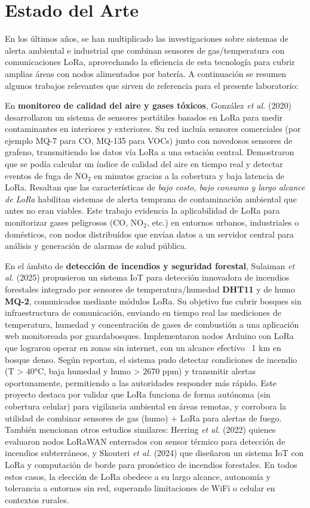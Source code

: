 \section{Estado del Arte}
En los últimos años, se han multiplicado las investigaciones sobre sistemas de alerta ambiental e industrial que combinan sensores de gas/temperatura con comunicaciones LoRa, aprovechando la eficiencia de esta tecnología para cubrir amplias áreas con nodos alimentados por batería. A continuación se resumen algunos trabajos relevantes que sirven de referencia para el presente laboratorio:

En \textbf{monitoreo de calidad del aire y gases tóxicos}, González \textit{et al.} (2020) \cite{Gonzalez2020} desarrollaron un sistema de sensores portátiles basados en LoRa para medir contaminantes en interiores y exteriores. Su red incluía sensores comerciales (por ejemplo MQ-7 para CO, MQ-135 para VOCs) junto con novedosos sensores de grafeno, transmitiendo los datos vía LoRa a una estación central. Demostraron que se podía calcular un índice de calidad del aire en tiempo real y detectar eventos de fuga de NO$_2$ en minutos gracias a la cobertura y baja latencia de LoRa. Resaltan que las características de \textit{bajo costo, bajo consumo y largo alcance de LoRa} habilitan sistemas de alerta temprana de contaminación ambiental que antes no eran viables. Este trabajo evidencia la aplicabilidad de LoRa para monitorizar gases peligrosos (CO, NO$_2$, etc.) en entornos urbanos, industriales o domésticos, con nodos distribuídos que envían datos a un servidor central para análisis y generación de alarmas de salud pública.

En el ámbito de \textbf{detección de incendios y seguridad forestal}, Sulaiman \textit{et al.} (2025) \cite{Sulaiman2025} propusieron un sistema IoT para detección innovadora de incendios forestales integrado por sensores de temperatura/humedad \textbf{DHT11} y de humo \textbf{MQ-2}, comunicados mediante módulos LoRa. Su objetivo fue cubrir bosques sin infraestructura de comunicación, enviando en tiempo real las mediciones de temperatura, humedad y concentración de gases de combustión a una aplicación web monitoreada por guardabosques. Implementaron nodos Arduino con LoRa que lograron operar en zonas sin internet, con un alcance efectivo ~1 km en bosque denso. Según reportan, el sistema pudo detectar condiciones de incendio (T > 40°C, baja humedad y humo > 2670 ppm) y transmitir alertas oportunamente, permitiendo a las autoridades responder más rápido. Este proyecto destaca por validar que LoRa funciona de forma autónoma (sin cobertura celular) para vigilancia ambiental en áreas remotas, y corrobora la utilidad de combinar sensores de gas (humo) + LoRa para alertas de fuego. También mencionan otros estudios similares: Herring \textit{et al.} (2022) \cite{Herring2022} quienes evaluaron nodos LoRaWAN enterrados con sensor térmico para detección de incendios subterráneos, y Skouteri \textit{et al.} (2024) \cite{article} que diseñaron un sistema IoT con LoRa y computación de borde para pronóstico de incendios forestales. En todos estos casos, la elección de LoRa obedece a su largo alcance, autonomía y tolerancia a entornos sin red, superando limitaciones de WiFi o celular en contextos rurales.

